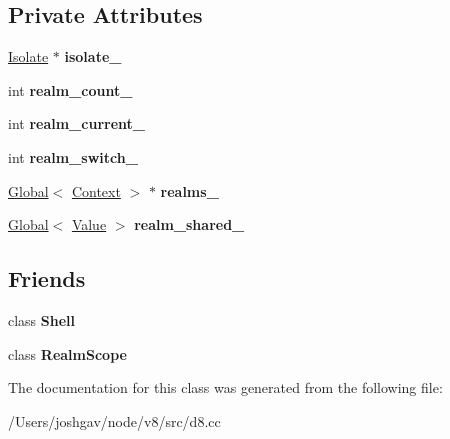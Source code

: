 \subsection*{Private Attributes}
\begin{DoxyCompactItemize}
\item 
\hyperlink{classv8_1_1_isolate}{Isolate} $\ast$ {\bfseries isolate\+\_\+}\hypertarget{classv8_1_1_per_isolate_data_a4b7ebf27819b45106bd217c69650a3e2}{}\label{classv8_1_1_per_isolate_data_a4b7ebf27819b45106bd217c69650a3e2}

\item 
int {\bfseries realm\+\_\+count\+\_\+}\hypertarget{classv8_1_1_per_isolate_data_aab8382a3a0df7bfbb6f70ce14da27b66}{}\label{classv8_1_1_per_isolate_data_aab8382a3a0df7bfbb6f70ce14da27b66}

\item 
int {\bfseries realm\+\_\+current\+\_\+}\hypertarget{classv8_1_1_per_isolate_data_a9caacbc35683dd07557879424a369a5e}{}\label{classv8_1_1_per_isolate_data_a9caacbc35683dd07557879424a369a5e}

\item 
int {\bfseries realm\+\_\+switch\+\_\+}\hypertarget{classv8_1_1_per_isolate_data_a9fd8b1b160fec93edb0ebedb3506e57b}{}\label{classv8_1_1_per_isolate_data_a9fd8b1b160fec93edb0ebedb3506e57b}

\item 
\hyperlink{classv8_1_1_global}{Global}$<$ \hyperlink{classv8_1_1_context}{Context} $>$ $\ast$ {\bfseries realms\+\_\+}\hypertarget{classv8_1_1_per_isolate_data_a451df8cab8c0473d66ab88c80778f1d3}{}\label{classv8_1_1_per_isolate_data_a451df8cab8c0473d66ab88c80778f1d3}

\item 
\hyperlink{classv8_1_1_global}{Global}$<$ \hyperlink{classv8_1_1_value}{Value} $>$ {\bfseries realm\+\_\+shared\+\_\+}\hypertarget{classv8_1_1_per_isolate_data_a5fdbc1b1e53c68791ac345bee93553f1}{}\label{classv8_1_1_per_isolate_data_a5fdbc1b1e53c68791ac345bee93553f1}

\end{DoxyCompactItemize}
\subsection*{Friends}
\begin{DoxyCompactItemize}
\item 
class {\bfseries Shell}\hypertarget{classv8_1_1_per_isolate_data_a7edf259cb12b10b3f2b1af7cf09d5664}{}\label{classv8_1_1_per_isolate_data_a7edf259cb12b10b3f2b1af7cf09d5664}

\item 
class {\bfseries Realm\+Scope}\hypertarget{classv8_1_1_per_isolate_data_a166fdcf1c9579470126f36582a059e3c}{}\label{classv8_1_1_per_isolate_data_a166fdcf1c9579470126f36582a059e3c}

\end{DoxyCompactItemize}


The documentation for this class was generated from the following file\+:\begin{DoxyCompactItemize}
\item 
/\+Users/joshgav/node/v8/src/d8.\+cc\end{DoxyCompactItemize}
